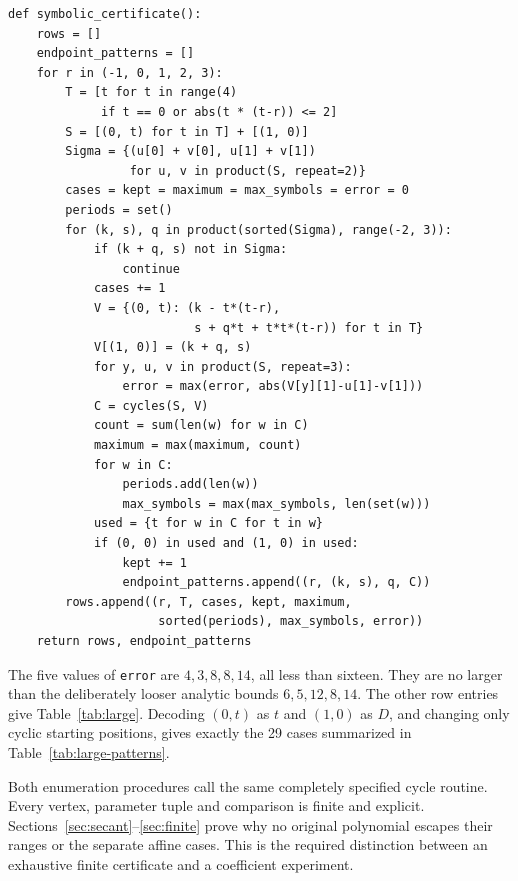 \begin{Verbatim}[fontsize=\footnotesize]
def symbolic_certificate():
    rows = []
    endpoint_patterns = []
    for r in (-1, 0, 1, 2, 3):
        T = [t for t in range(4)
             if t == 0 or abs(t * (t-r)) <= 2]
        S = [(0, t) for t in T] + [(1, 0)]
        Sigma = {(u[0] + v[0], u[1] + v[1])
                 for u, v in product(S, repeat=2)}
        cases = kept = maximum = max_symbols = error = 0
        periods = set()
        for (k, s), q in product(sorted(Sigma), range(-2, 3)):
            if (k + q, s) not in Sigma:
                continue
            cases += 1
            V = {(0, t): (k - t*(t-r),
                          s + q*t + t*t*(t-r)) for t in T}
            V[(1, 0)] = (k + q, s)
            for y, u, v in product(S, repeat=3):
                error = max(error, abs(V[y][1]-u[1]-v[1]))
            C = cycles(S, V)
            count = sum(len(w) for w in C)
            maximum = max(maximum, count)
            for w in C:
                periods.add(len(w))
                max_symbols = max(max_symbols, len(set(w)))
            used = {t for w in C for t in w}
            if (0, 0) in used and (1, 0) in used:
                kept += 1
                endpoint_patterns.append((r, (k, s), q, C))
        rows.append((r, T, cases, kept, maximum,
                     sorted(periods), max_symbols, error))
    return rows, endpoint_patterns
\end{Verbatim}

The five values of \texttt{error} are $4,3,8,8,14$, all less than
sixteen. They are no larger than the deliberately looser analytic
bounds $6,5,12,8,14$. The other row entries give
Table~\ref{tab:large}. Decoding $(0,t)$ as $t$ and $(1,0)$ as
$D$, and changing only cyclic starting positions, gives exactly
the 29 cases summarized in Table~\ref{tab:large-patterns}.

Both enumeration procedures call the same completely specified
cycle routine. Every vertex, parameter tuple and comparison is
finite and explicit. Sections~\ref{sec:secant}--\ref{sec:finite}
prove why no original polynomial escapes their ranges or the
separate affine cases. This is the required distinction between
an exhaustive finite certificate and a coefficient experiment.
